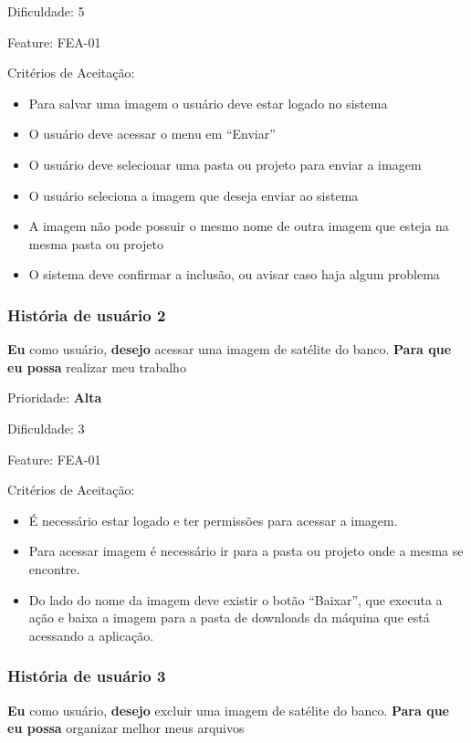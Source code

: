     Dificuldade: 5

    Feature: FEA-01

    Critérios de Aceitação:
    \begin{itemize}
      \item Para salvar uma imagem o usuário deve estar logado no sistema
      \item O usuário deve acessar o menu em “Enviar”
      \item O usuário deve selecionar uma pasta ou projeto para enviar a imagem 
      \item O usuário seleciona a imagem que deseja enviar ao sistema
      \item A imagem não pode possuir o mesmo nome de outra imagem que esteja na mesma pasta ou projeto
      \item O sistema deve confirmar a inclusão, ou avisar caso haja algum problema
    \end{itemize}


  \subsubsection{História de usuário 2}

    \textbf{Eu} como usuário, \textbf{desejo} acessar uma imagem de satélite do banco. \textbf{Para que eu possa} realizar meu trabalho

    Prioridade: \textbf{Alta}

    Dificuldade: 3

    Feature: FEA-01

    Critérios de Aceitação:
    \begin{itemize}
      \item É necessário estar logado e ter permissões para acessar a imagem. 
      \item Para acessar imagem é necessário ir para a pasta ou projeto onde a mesma se encontre.
      \item Do lado do nome da imagem deve existir o botão “Baixar”, que executa a ação e baixa a imagem para a pasta de downloads da máquina que está acessando a aplicação.
    \end{itemize}

  \subsubsection{História de usuário 3}

    \textbf{Eu} como usuário, \textbf{desejo} excluir uma imagem de satélite do banco. \textbf{Para que eu possa} organizar melhor meus arquivos

